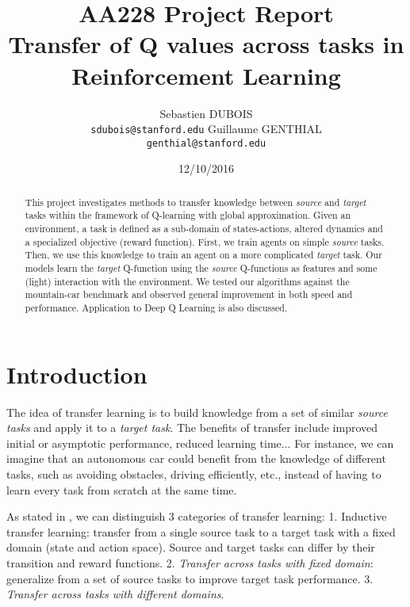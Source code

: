 \documentclass{article}
\title{AA228 Project Report\\
\LARGE{Transfer of Q values across tasks in Reinforcement Learning} %
}
\author{
Sebastien DUBOIS\\
\texttt{sdubois@stanford.edu} 
\And Guillaume GENTHIAL\\
\texttt{genthial@stanford.edu}}
\date{12/10/2016}
\begin{document}
\maketitle
\begin{abstract}
This project investigates methods to transfer knowledge between \textit{source}  and \textit{target} tasks within the framework of Q-learning with global approximation. Given an environment, a task is defined as a sub-domain of states-actions, altered dynamics and a specialized objective (reward function). First, we train agents on simple \textit{source} tasks. Then, we use this knowledge to train an agent on a more complicated \textit{target} task. Our models learn the \textit{target} Q-function using the \textit{source} Q-functions as features and some (light) interaction with the environment. We tested our algorithms against the mountain-car benchmark and observed general improvement in both speed and performance. Application to Deep Q Learning is also discussed.

\end{abstract}
\section{Introduction}
The idea of transfer learning is to build knowledge from a set of similar \textit{source tasks} and apply it to a \textit{target task}. The benefits of transfer include improved initial or asymptotic performance, reduced learning time... For instance, we can imagine that an autonomous car could benefit from the knowledge of different tasks, such as avoiding obstacles, driving efficiently, etc., instead of having to learn every task from scratch at the same time. 

As stated in \cite{Lazaric2012}, we can distinguish 3 categories of transfer learning:
1. {Inductive transfer learning}: transfer from a single source task to a target task with a fixed domain (state and action space). Source and target tasks can differ by their transition and reward functions. 2. \textit{Transfer across tasks with fixed domain}: generalize from a set of source tasks to improve target task performance. 3. \textit{Transfer across tasks with different domains}.
 
\end{document}
